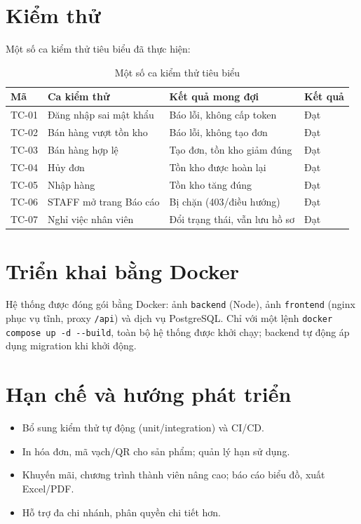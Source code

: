 \documentclass[12pt,a4paper]{report}
\begin{document}
\section{Kiểm thử}
Một số ca kiểm thử tiêu biểu đã thực hiện:
\begin{table}[H]\centering\small
\begin{tabularx}{\textwidth}{|L{1.3cm}|L{4.4cm}|X|C{2cm}|}
\hline
\textbf{Mã} & \textbf{Ca kiểm thử} & \textbf{Kết quả mong đợi} & \textbf{Kết quả} \\ \hline
TC-01 & Đăng nhập sai mật khẩu & Báo lỗi, không cấp token & Đạt \\ \hline
TC-02 & Bán hàng vượt tồn kho & Báo lỗi, không tạo đơn & Đạt \\ \hline
TC-03 & Bán hàng hợp lệ & Tạo đơn, tồn kho giảm đúng & Đạt \\ \hline
TC-04 & Hủy đơn & Tồn kho được hoàn lại & Đạt \\ \hline
TC-05 & Nhập hàng & Tồn kho tăng đúng & Đạt \\ \hline
TC-06 & STAFF mở trang Báo cáo & Bị chặn (403/điều hướng) & Đạt \\ \hline
TC-07 & Nghỉ việc nhân viên & Đổi trạng thái, vẫn lưu hồ sơ & Đạt \\ \hline
\end{tabularx}
\caption{Một số ca kiểm thử tiêu biểu}
\end{table}

\section{Triển khai bằng Docker}
Hệ thống được đóng gói bằng Docker: ảnh \texttt{backend} (Node), ảnh \texttt{frontend} (nginx phục vụ tĩnh, proxy \texttt{/api}) và dịch vụ PostgreSQL. Chỉ với một lệnh \texttt{docker compose up -d -{}-build}, toàn bộ hệ thống được khởi chạy; backend tự động áp dụng migration khi khởi động.

\section{Hạn chế và hướng phát triển}
\begin{itemize}[leftmargin=1.4cm,nosep]
  \item Bổ sung kiểm thử tự động (unit/integration) và CI/CD.
  \item In hóa đơn, mã vạch/QR cho sản phẩm; quản lý hạn sử dụng.
  \item Khuyến mãi, chương trình thành viên nâng cao; báo cáo biểu đồ, xuất Excel/PDF.
  \item Hỗ trợ đa chi nhánh, phân quyền chi tiết hơn.
\end{itemize}
\end{document}
